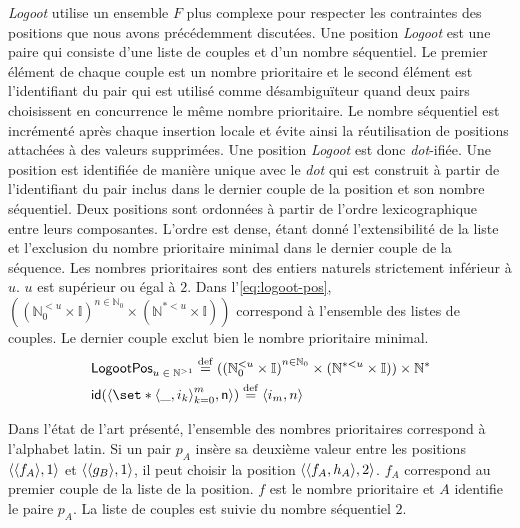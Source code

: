 \emph{Logoot} utilise un ensemble $F$ plus complexe pour respecter les contraintes des positions que nous avons précédemment discutées.
Une position \emph{Logoot} est une paire qui consiste d'une liste de couples et d'un nombre séquentiel.
Le premier élément de chaque couple est un nombre prioritaire et le second élément est l'identifiant du pair qui est utilisé comme désambiguïteur quand deux pairs choisissent en concurrence le même nombre prioritaire.
Le nombre séquentiel est incrémenté après chaque insertion locale et évite ainsi la réutilisation de positions attachées à des valeurs supprimées.
Une position \emph{Logoot} est donc \emph{dot}-ifiée.
Une position est identifiée de manière unique avec le \emph{dot} qui est construit à partir de l'identifiant du pair inclus dans le dernier couple de la position et son nombre séquentiel.
Deux positions sont ordonnées à partir de l'ordre lexicographique entre leurs composantes.
L'ordre est dense, étant donné l'extensibilité de la liste et l'exclusion du nombre prioritaire minimal dans le dernier couple de la séquence.
Les nombres prioritaires sont des entiers naturels strictement inférieur à $u$.
$u$ est supérieur ou égal à $2$.
Dans l'\autoref{eq:logoot-pos}, $({(\mathbb{N}_0^{< u} \times \mathbb{I})}^{n \in \mathbb{N}_0} \times (\mathbb{N}^{* < u} \times \mathbb{I}))$ correspond à l'ensemble des listes de couples.
Le dernier couple exclut bien le nombre prioritaire minimal.
%
\begin{align}
&\trm{LogootPos}_{u\;\in\;\mathbb{N}^{> 1}} \defeq ({(\mathbb{N}_0^{< u} \times \mathbb{I})}^{n \in \mathbb{N}_0} \times (\mathbb{N}^{* < u} \times \mathbb{I})) \times \mathbb{N}^*\label{eq:logoot-pos}\\
&\trm{id}(\tuple*{\set*{\tuple*{\_, i_k}}_{k=0}^m, \trm{n}}) \defeq \tuple*{i_m, n}
\end{align}

Dans l'état de l'art présenté, l'ensemble des nombres prioritaires correspond à l'alphabet latin.
Si un pair $p_A$ insère sa deuxième valeur entre les positions $\tuple*{\tuple*{f_A}, 1}$ et $\tuple*{\tuple*{g_B}, 1}$, il peut choisir la position $\tuple*{\tuple*{f_A, h_A}, 2}$.
$f_A$ correspond au premier couple de la liste de la position.
$f$ est le nombre prioritaire et $A$ identifie le paire $p_A$.
La liste de couples est suivie du nombre séquentiel $2$.


